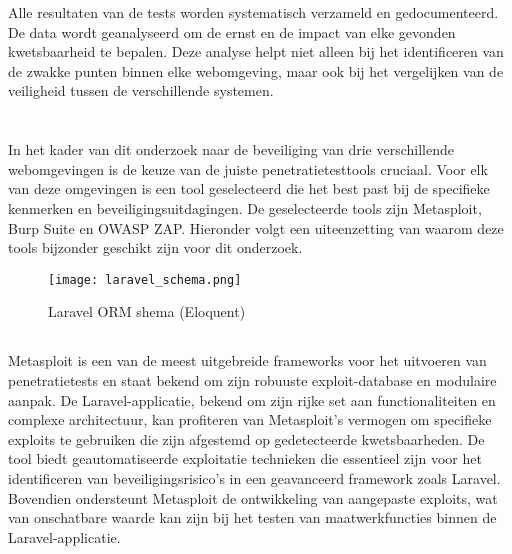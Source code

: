 Alle resultaten van de tests worden systematisch verzameld en gedocumenteerd. De data wordt geanalyseerd 
om de ernst en de impact van elke gevonden kwetsbaarheid te bepalen. Deze analyse helpt niet alleen bij 
het identificeren van de zwakke punten binnen elke webomgeving, maar ook bij het vergelijken van de 
veiligheid tussen de verschillende systemen.

\section{}
In het kader van dit onderzoek naar de beveiliging van drie verschillende webomgevingen is de keuze van 
de juiste penetratietesttools cruciaal. Voor elk van deze omgevingen is een tool geselecteerd die het 
best past bij de specifieke kenmerken en beveiligingsuitdagingen. De geselecteerde tools zijn 
Metasploit, Burp Suite en OWASP ZAP. Hieronder volgt een uiteenzetting van waarom deze tools 
bijzonder geschikt zijn voor dit onderzoek.
\begin{figure}
    \centering
    \texttt{[image: laravel\_schema.png]}
    \caption[Laravel ORM schema (Eloquent)]{Laravel ORM shema (Eloquent)}
\end{figure}
\subsection{}
Metasploit is een van de meest uitgebreide frameworks voor het uitvoeren van penetratietests en 
staat bekend om zijn robuuste exploit-database en modulaire aanpak. De Laravel-applicatie, bekend 
om zijn rijke set aan functionaliteiten en complexe architectuur, kan profiteren van Metasploit's 
vermogen om specifieke exploits te gebruiken die zijn afgestemd op gedetecteerde kwetsbaarheden. 
De tool biedt geautomatiseerde exploitatie technieken die essentieel zijn voor het identificeren 
van beveiligingsrisico’s in een geavanceerd framework zoals Laravel. Bovendien ondersteunt 
Metasploit de ontwikkeling van aangepaste exploits, wat van onschatbare waarde kan zijn bij 
het testen van maatwerkfuncties binnen de Laravel-applicatie.

